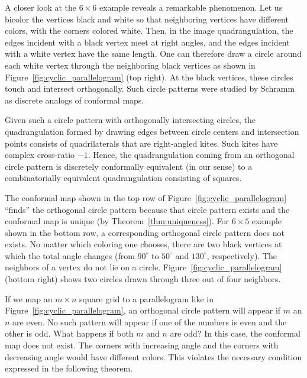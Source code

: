 \documentclass[Thesis]{subfiles}
\begin{document}
A closer look at the $6\times 6$ example reveals a remarkable
phenomenon. Let us bicolor the vertices black and white so that
neighboring vertices have different colors, with the corners colored
white. Then, in the image quadrangulation, the edges incident with a
black vertex meet at right angles, and the edges incident with a white
vertex have the same length. One can therefore draw a circle around
each white vertex through the neighboring black vertices as shown in
Figure~\ref{fig:cyclic_parallelogram} (top right). At the black
vertices, these circles touch and intersect orthogonally. Such circle
patterns were studied by Schramm~\cite{S97} as discrete analogs of
conformal maps.

Given such a circle pattern with orthogonally intersecting circles,
the quadrangulation formed by drawing edges between circle centers and
intersection points consists of quadrilaterals that are right-angled
kites. Such kites have complex cross-ratio $-1$. Hence, the
quadrangulation coming from an orthogonal circle pattern is discretely
conformally equivalent (in our sense) to a combinatorially equivalent
quadrangulation consisting of squares. 

The conformal map shown in the top row of
Figure~\ref{fig:cyclic_parallelogram} ``finds'' the orthogonal circle
pattern because that circle pattern exists and the conformal map is
unique (by Theorem~\ref{thm:uniqueness}). For $6\times 5$ example shown
in the bottom row, a corresponding orthogonal circle pattern does not
exists. No matter which coloring one chooses, there are two black
vertices at which the total angle changes (from $90^{\circ}$ to
$50^{\circ}$ and $130^{\circ}$, respectively). The neighbors of a
vertex do not lie on a circle. Figure~\ref{fig:cyclic_parallelogram}
(bottom right) shows two circles drawn through three out of four neighbors.


If we map an $m\times n$ square grid to a parallelogram like in
Figure~\ref{fig:cyclic_parallelogram}, an orthogonal circle pattern
will appear if $m$ an $n$ are even. No such pattern will appear if one
of the numbers is even and the other is odd. What happens if both $m$
and $n$ are odd? In this case, the conformal map does not exist. The
corners with increasing angle and the corners with decreasing angle
would have different colors. This violates the necessary condition
expressed in the following theorem.
\end{document}
